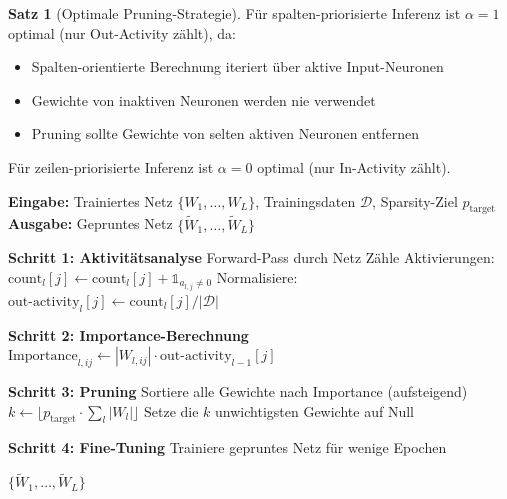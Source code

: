 \documentclass[a4paper,12pt]{report}
\theoremstyle{definition}
\newtheorem{satz}{Satz}
\begin{document}
	\begin{satz}[Optimale Pruning-Strategie]
		Für spalten-priorisierte Inferenz ist $\alpha = 1$ optimal (nur Out-Activity zählt), da:
		\begin{itemize}
			\item Spalten-orientierte Berechnung iteriert über aktive Input-Neuronen
			\item Gewichte von inaktiven Neuronen werden nie verwendet
			\item Pruning sollte Gewichte von selten aktiven Neuronen entfernen
		\end{itemize}
		
		Für zeilen-priorisierte Inferenz ist $\alpha = 0$ optimal (nur In-Activity zählt).
	\end{satz}
	
	\begin{algorithm}[H]
		\caption{Asymmetrie-bewusstes Structured Pruning}
		\label{alg:asymmetry-aware-pruning}
		\textbf{Eingabe:} Trainiertes Netz $\{W_1, \ldots, W_L\}$, Trainingsdaten $\mathcal{D}$, Sparsity-Ziel $p_{\text{target}}$ \\
		\textbf{Ausgabe:} Gepruntes Netz $\{\tilde{W}_1, \ldots, \tilde{W}_L\}$
		\begin{algorithmic}[1]
			\State \textbf{Schritt 1: Aktivitätsanalyse}
			\State Forward-Pass durch Netz
			\State Zähle Aktivierungen: $\text{count}_l[j] \gets \text{count}_l[j] + \mathbb{1}_{a_{l,j} \neq 0}$
			\EndFor
			\EndFor
			\State Normalisiere: $\text{out-activity}_l[j] \gets \text{count}_l[j] / |\mathcal{D}|$
			
			\State \textbf{Schritt 2: Importance-Berechnung}
			\State $\text{Importance}_{l,ij} \gets |W_{l,ij}| \cdot \text{out-activity}_{l-1}[j]$
			\EndFor
			\EndFor
			
			\State \textbf{Schritt 3: Pruning}
			\State Sortiere alle Gewichte nach Importance (aufsteigend)
			\State $k \gets \lfloor p_{\text{target}} \cdot \sum_l |W_l| \rfloor$
			\State Setze die $k$ unwichtigsten Gewichte auf Null
			
			\State \textbf{Schritt 4: Fine-Tuning}
			\State Trainiere gepruntes Netz für wenige Epochen
			
			\State \Return $\{\tilde{W}_1, \ldots, \tilde{W}_L\}$
		\end{algorithmic}
	\end{algorithm}
\end{document}
